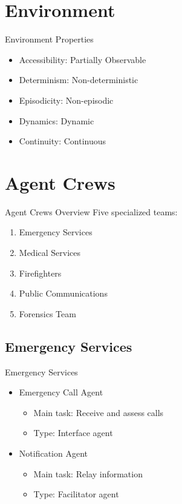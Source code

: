 \documentclass{beamer}
\begin{document}
\section{Environment}
\begin{frame}{Environment Properties}
    \begin{itemize}
        \item Accessibility: Partially Observable
        \item Determinism: Non-deterministic
        \item Episodicity: Non-episodic
        \item Dynamics: Dynamic
        \item Continuity: Continuous
    \end{itemize}
\end{frame}

\section{Agent Crews}
\begin{frame}{Agent Crews Overview}
    Five specialized teams:
    \begin{enumerate}
        \item Emergency Services
        \item Medical Services
        \item Firefighters
        \item Public Communications
        \item Forensics Team
    \end{enumerate}
\end{frame}

\subsection{Emergency Services}
\begin{frame}{Emergency Services}
    \begin{itemize}
        \item Emergency Call Agent
        \begin{itemize}
            \item Main task: Receive and assess calls
            \item Type: Interface agent
        \end{itemize}
        \item Notification Agent
        \begin{itemize}
            \item Main task: Relay information
            \item Type: Facilitator agent
        \end{itemize}
    \end{itemize}
\end{frame}
\end{document}
